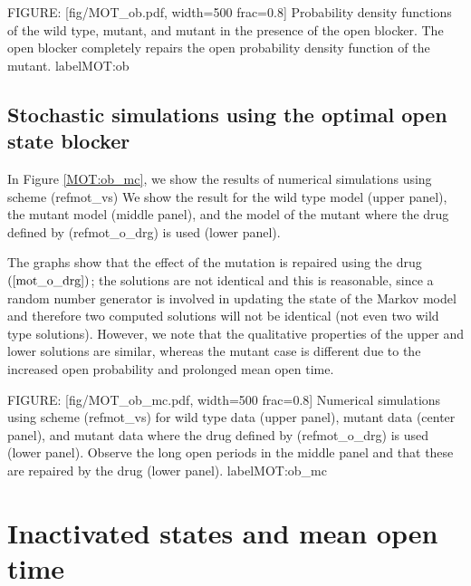 FIGURE: [fig/MOT_ob.pdf, width=500 frac=0.8] Probability density functions of the wild type, mutant, and mutant in the presence of the open blocker. The open blocker completely
repairs the open probability density function of the mutant.  label{MOT:ob}

\subsection{Stochastic simulations using the optimal open state blocker}

In Figure \ref{MOT:ob_mc}, we show the results of numerical
simulations using scheme
(ref{mot_vs}) We show the result for the wild type model
(upper panel), the mutant model (middle panel), and the model of the mutant 
where the drug defined by (ref{mot_o_drg}) is used (lower panel).

The graphs show that the effect of the mutation is repaired using the drug $\left(
\ref{mot_o_drg}\right) $; the solutions are not identical and this is
reasonable, since a random number generator is involved in updating the state
of the Markov model and therefore two computed solutions will not be identical
(not even two wild type solutions). However, we note that the qualitative properties
of the upper and lower solutions are similar, whereas the mutant case is
different due to the increased open probability and prolonged mean open time.

FIGURE: [fig/MOT_ob_mc.pdf, width=500 frac=0.8] Numerical simulations using scheme (ref{mot_vs})
for wild type data (upper panel), mutant data (center panel), and mutant data where the drug
defined by (ref{mot_o_drg}) is used (lower panel). 
Observe the long open periods in the middle panel
and that these are repaired by the drug (lower panel). label{MOT:ob_mc}\section{Inactivated states and mean open time}

